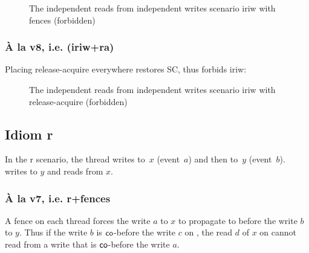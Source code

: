 \documentclass[a4paper]{article}
\begin{document}
\begin{figure}[!h]
\begin{center}
\end{center}
\caption{The independent reads from independent writes scenario \textsf{iriw}
with fences (forbidden)\label{fig:iriw}}
\end{figure}


\subsubsection{\`A la v8, i.e. (\textsf{iriw+ra})}

Placing release-acquire everywhere restores SC, thus forbids \textsf{iriw}:

\begin{figure}[!h]
\begin{center}
\end{center}
\caption{The independent reads from independent writes scenario \textsf{iriw}
with release-acquire (forbidden)\label{fig:iriw-ra}}
\end{figure}


\clearpage

\subsection{Idiom \textsf{r}}

In the \textsf{r} scenario, the thread  writes to~$x$ (event~$a$) and
then to~$y$ (event~$b$).  writes to $y$ and reads from $x$.

\subsubsection{\`A la v7, i.e. \textsf{r+fences}}

A fence on each thread forces the write $a$ to $x$ to propagate to 
before the write $b$ to $y$. Thus if the write $b$ is $\mathsf{co}$-before the write
$c$ on , the read $d$ of $x$ on  cannot read from a write that
is $\mathsf{co}$-before the write $a$.
\end{document}
